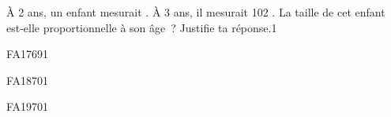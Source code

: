 \documentclass[a4paper,11pt]{report}
\begin{document}
\begin{exo}
	{À 2 ans, un enfant mesurait . À 3 ans, il mesurait 102 \tunit{}{\cm}. La taille de cet enfant est-elle proportionnelle à son âge~? Justifie ta réponse.}{1}
\end{exo}



\begin{exol}{FA17}{69}{1}\end{exol}
\begin{exol}{FA18}{70}{1}\end{exol}
\begin{exol}{FA19}{70}{1}\end{exol}
\end{document}
